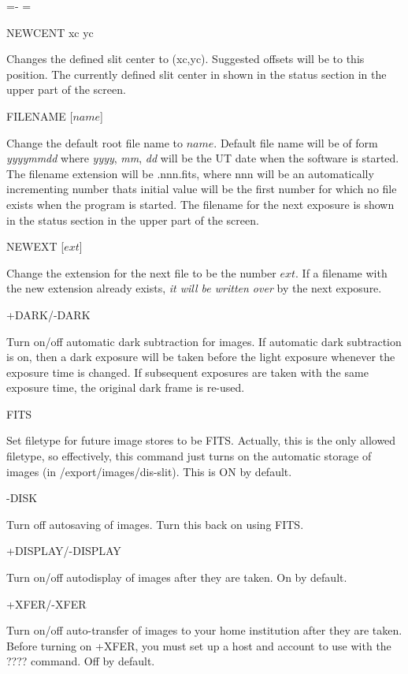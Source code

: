 \documentclass[10pt]{article}
\renewcommand{\[}{\begin{eqnarray}}
\renewcommand{\]}{\end{eqnarray}}
\newenvironment{hanging}{
        \begin{list}{}{
                \labelsep=0pt
                \labelwidth=0pt
                \listparindent=0pt
                \itemindent=-\leftmargini
                \leftmargin=\leftmargini
        }
}{
        \end{list}
}
\begin{document}
\begin{hanging}
\item{NEWCENT xc yc}

Changes the defined slit center to (xc,yc). Suggested offsets will be to
this position. The currently defined slit center in shown in the status
section in the upper part of the screen.

\item{FILENAME [$name$]}

Change the default root file name to $name$. Default file name will be of
form \textit{yyyymmdd} where \textit{yyyy}, \textit{mm}, \textit{dd} will be
the UT date when the software is started. The filename extension will be
.nnn.fits, where nnn will be an automatically incrementing number thats
initial value will be the first number for which no file exists when the
program is started. The filename for the next exposure is shown in the
status section in the upper part of the screen.

\item{NEWEXT [$ext$]}

Change the extension for the next file to be the number $ext$. If a filename
with the new extension already exists, \textit{it will be written over}
by the next exposure.

\item{+DARK/-DARK}

Turn on/off automatic dark subtraction for images. If automatic dark
subtraction is on, then a dark exposure will be taken before the light
exposure whenever the exposure time is changed. If subsequent exposures
are taken with the same exposure time, the original dark frame is 
re-used.

\item{FITS}

Set filetype for future image stores to be FITS. Actually, this is the
only allowed filetype, so effectively, this command just turns on the
automatic storage of images (in /export/images/dis-slit). This is ON
by default.

\item{-DISK}

Turn off autosaving of images. Turn this back on using FITS.

\item{+DISPLAY/-DISPLAY}

Turn on/off autodisplay of images after they are taken. On by default.

\item{+XFER/-XFER}

Turn on/off auto-transfer of images to your home institution after they are 
taken.  Before turning on +XFER, you must set up a host and account to
use with the ???? command. Off by default.


\end{hanging}
\end{document}
